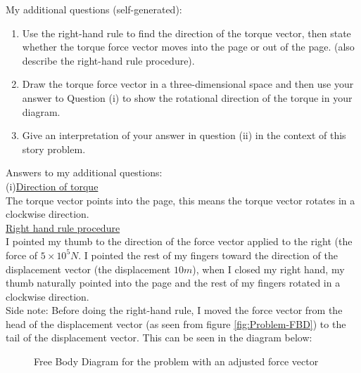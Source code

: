 \documentclass{turabian-researchpaper}
\begin{document}
My additional questions (self-generated): \\ 

\begin{enumerate}[label=(\roman*)]
    \item Use the right-hand rule to find the direction of the torque vector, then state whether the torque force vector moves into the page or out of the page. (also describe the right-hand rule procedure). 
    \item Draw the torque force vector in a three-dimensional space and then use your answer to Question (i) to show the rotational direction of the torque in your diagram.  
    \item Give an interpretation of your answer in question (ii) in the context of this story problem. 
\end{enumerate}   

Answers to my additional questions: \\ 

(i)\underline{Direction of torque} \\

The torque vector points into the page, this means the torque vector rotates in a clockwise direction. \\ 

\underline{Right hand rule procedure} \\ 

I pointed my thumb to the direction of the force vector applied to the right (the force of \(5 \times 10^5N\). I pointed the rest of my fingers toward the direction of the displacement vector (the displacement \(10m\)), when I closed my right hand, my thumb naturally pointed into the page and the rest of my fingers rotated in a clockwise direction. \\ 

Side note: Before doing the right-hand rule, I moved the force vector from the head of the displacement vector (as seen from figure \ref{fig:Problem-FBD}) to the tail of the displacement vector. This can be seen in the diagram below: \\ 

\begin{figure}[H] 
    \centering
    \caption{Free Body Diagram for the problem with an adjusted force vector} 
    \label{fig:Problem-FBD2} 
\end{figure}
\end{document}
